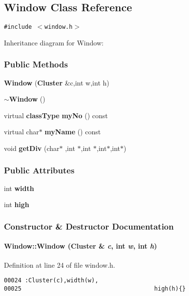 \subsection{Window  Class Reference}
\label{Window}
{\tt \#include $<$window.h$>$}

Inheritance diagram for Window:\begin{figure}[H]
\begin{center}
\leavevmode
\setlength{\epsfysize}{4cm}
\end{center}
\end{figure}
\subsubsection*{Public Methods}
\begin{CompactItemize}
\item 
{\bf Window} ({\bf Cluster} \&c,int w,int h)
\item 
{\bf $\sim$Window} ()
\item 
virtual {\bf class\-Type} {\bf my\-No} () const
\item 
virtual char$\ast$ {\bf my\-Name} () const
\item 
void {\bf get\-Div} (char$\ast$ ,int $\ast$,int $\ast$,int$\ast$,int$\ast$)
\end{CompactItemize}
\subsubsection*{Public Attributes}
\begin{CompactItemize}
\item 
int {\bf width}
\item 
int {\bf high}
\end{CompactItemize}


\subsubsection{Constructor \& Destructor Documentation}
\label{Window_a0}
\paragraph{\setlength{\rightskip}{0pt plus 5cm}Window::Window ({\bf Cluster} \& {\em c}, int {\em w}, int {\em h})}\hfill



Definition at line 24 of file window.h.\small\begin{verbatim}00024 :Cluster(c),width(w),
00025                                      high(h){}
\end{verbatim}\normalsize 
\label{Window_a1}
